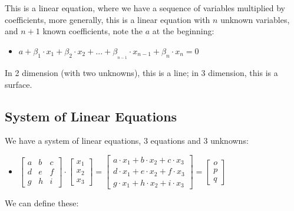 \documentclass[
]{book}
\providecommand{\tightlist}{%
  \setlength{\itemsep}{0pt}\setlength{\parskip}{0pt}}
\begin{document}
This is a linear equation, where we have a sequence of variables
multiplied by coefficients, more generally, this is a linear equation
with \(n\) unknown variables, and \(n+1\) known coefficients, note the \(a\)
at the beginning:

\begin{itemize}
\tightlist
\item
  \(\displaystyle a+\beta_1 \cdot x_1 +\beta_2 \cdot x_2 +...+\beta_{_{n-1} } \cdot x_{n-1} +\beta_n \cdot x_n =0\)
\end{itemize}

In 2 dimension (with two unknowns), this is a line; in 3 dimension, this
is a surface.

\hypertarget{system-of-linear-equations-1}{%
\subsection{System of Linear Equations}\label{system-of-linear-equations-1}}

We have a system of linear equations, 3 equations and 3 unknowns:

\begin{itemize}
\tightlist
\item
  \(\displaystyle \left\lbrack \begin{array}{ccc} a & b & c\\ d & e & f\\ g & h & i \end{array}\right\rbrack \cdot \left\lbrack \begin{array}{c} x_1 \\ x_2 \\ x_3 \end{array}\right\rbrack =\left\lbrack \begin{array}{cc} a\cdot x_1 +b\cdot x_2 +c\cdot x_3 \\ d\cdot x_1 +e\cdot x_2 +f\cdot x_3 \\ g\cdot x_1 +h\cdot x_2 +i\cdot x_3 \end{array}\right\rbrack =\left\lbrack \begin{array}{c} o\\ p\\ q \end{array}\right\rbrack\)
\end{itemize}

We can define these:
\end{document}
